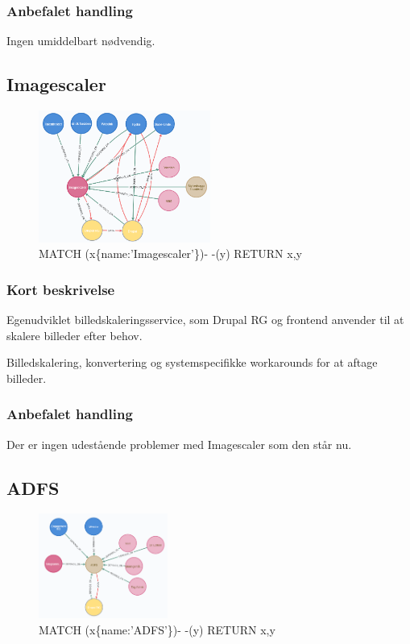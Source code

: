 \documentclass{article}
\begin{document}
\subsubsection{Anbefalet handling}
Ingen umiddelbart nødvendig.


\subsection{Imagescaler}
\begin{figure}[h]
\includegraphics[width=160pt]{Imagescaler.PNG}
\caption{MATCH (x\{name:'Imagescaler'\})- -(y) RETURN x,y}
\end{figure}
\subsubsection{Kort beskrivelse}
Egenudviklet billedskaleringsservice, som Drupal RG og frontend anvender til at skalere billeder efter behov.	

Billedskalering, konvertering og systemspecifikke workarounds for at aftage billeder.
\subsubsection{Anbefalet handling}
Der er ingen udestående problemer med Imagescaler som den står nu. 


\subsection{ADFS}
\begin{figure}[h]
\includegraphics[width=120pt]{ADFS.PNG}
\caption{MATCH (x\{name:'ADFS'\})- -(y) RETURN x,y}
\end{figure}
\end{document}
